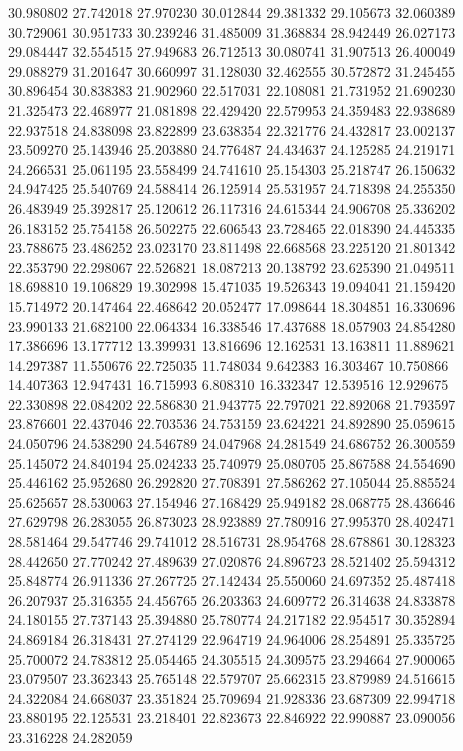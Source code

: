 30.980802
27.742018
27.970230
30.012844
29.381332
29.105673
32.060389
30.729061
30.951733
30.239246
31.485009
31.368834
28.942449
26.027173
29.084447
32.554515
27.949683
26.712513
30.080741
31.907513
26.400049
29.088279
31.201647
30.660997
31.128030
32.462555
30.572872
31.245455
30.896454
30.838383
21.902960
22.517031
22.108081
21.731952
21.690230
21.325473
22.468977
21.081898
22.429420
22.579953
24.359483
22.938689
22.937518
24.838098
23.822899
23.638354
22.321776
24.432817
23.002137
23.509270
25.143946
25.203880
24.776487
24.434637
24.125285
24.219171
24.266531
25.061195
23.558499
24.741610
25.154303
25.218747
26.150632
24.947425
25.540769
24.588414
26.125914
25.531957
24.718398
24.255350
26.483949
25.392817
25.120612
26.117316
24.615344
24.906708
25.336202
26.183152
25.754158
26.502275
22.606543
23.728465
22.018390
24.445335
23.788675
23.486252
23.023170
23.811498
22.668568
23.225120
21.801342
22.353790
22.298067
22.526821
18.087213
20.138792
23.625390
21.049511
18.698810
19.106829
19.302998
15.471035
19.526343
19.094041
21.159420
15.714972
20.147464
22.468642
20.052477
17.098644
18.304851
16.330696
23.990133
21.682100
22.064334
16.338546
17.437688
18.057903
24.854280
17.386696
13.177712
13.399931
13.816696
12.162531
13.163811
11.889621
14.297387
11.550676
22.725035
11.748034
9.642383
16.303467
10.750866
14.407363
12.947431
16.715993
6.808310
16.332347
12.539516
12.929675
22.330898
22.084202
22.586830
21.943775
22.797021
22.892068
21.793597
23.876601
22.437046
22.703536
24.753159
23.624221
24.892890
25.059615
24.050796
24.538290
24.546789
24.047968
24.281549
24.686752
26.300559
25.145072
24.840194
25.024233
25.740979
25.080705
25.867588
24.554690
25.446162
25.952680
26.292820
27.708391
27.586262
27.105044
25.885524
25.625657
28.530063
27.154946
27.168429
25.949182
28.068775
28.436646
27.629798
26.283055
26.873023
28.923889
27.780916
27.995370
28.402471
28.581464
29.547746
29.741012
28.516731
28.954768
28.678861
30.128323
28.442650
27.770242
27.489639
27.020876
24.896723
28.521402
25.594312
25.848774
26.911336
27.267725
27.142434
25.550060
24.697352
25.487418
26.207937
25.316355
24.456765
26.203363
24.609772
26.314638
24.833878
24.180155
27.737143
25.394880
25.780774
24.217182
22.954517
30.352894
24.869184
26.318431
27.274129
22.964719
24.964006
28.254891
25.335725
25.700072
24.783812
25.054465
24.305515
24.309575
23.294664
27.900065
23.079507
23.362343
25.765148
22.579707
25.662315
23.879989
24.516615
24.322084
24.668037
23.351824
25.709694
21.928336
23.687309
22.994718
23.880195
22.125531
23.218401
22.823673
22.846922
22.990887
23.090056
23.316228
24.282059
